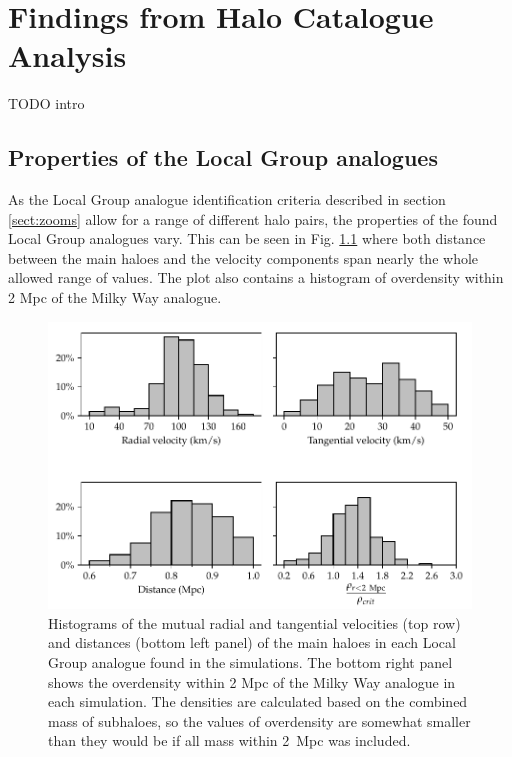 \documentclass[english, oneside]{HYgradu}
\begin{document}
\chapter{Findings from Halo Catalogue Analysis}
TODO intro %


\section{Properties of the Local Group analogues}
As the Local Group analogue identification criteria described in section \ref{sect:zooms} allow for a range of different halo pairs, the properties of the found Local Group analogues vary. This can be seen in Fig. \ref{fig:LGproperties} where both distance between the main haloes and the velocity components span nearly the whole allowed range of values. The plot also contains a histogram of overdensity within 2 Mpc of the Milky Way analogue.

\begin{figure}
    \centering
    \includegraphics{kuvat/LGproperties.pdf}
    \caption{Histograms of the mutual radial and tangential velocities (top row) and distances (bottom left panel) of the main haloes in each Local Group analogue found in the simulations. The bottom right panel shows the overdensity within 2 Mpc of the Milky Way analogue in each simulation. The densities are calculated based on the combined mass of subhaloes, so the values of overdensity are somewhat smaller than they would be if all mass within 2~Mpc was included.}\label{fig:LGproperties}
\end{figure}
\end{document}
